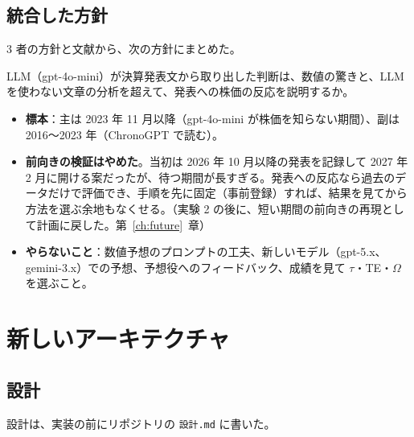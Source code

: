 \documentclass[xelatex,ja=standard,jafont=haranoaji,a4paper,10pt]{bxjsreport}
\newcommand{\code}[1]{\texttt{#1}}
\newcommand{\chapref}[1]{第~\ref{#1}~章}
\begin{document}
\chapter{統合した方針}\label{ch:plan}

3 者の方針と文献から、次の方針にまとめた。

\begin{verdict}[研究の主な問い]
LLM（gpt-4o-mini）が決算発表文から取り出した判断は、数値の驚きと、LLM を使わない文章の分析を超えて、発表への株価の反応を説明するか。
\end{verdict}

\begin{itemize}
\item \textbf{標本}：主は 2023 年 11 月以降（gpt-4o-mini が株価を知らない期間）、副は 2016〜2023 年（ChronoGPT で読む）。
\item \textbf{前向きの検証はやめた}。当初は 2026 年 10 月以降の発表を記録して 2027 年 2 月に開ける案だったが、待つ期間が長すぎる。発表への反応なら過去のデータだけで評価でき、手順を先に固定（事前登録）すれば、結果を見てから方法を選ぶ余地もなくせる。（実験 2 の後に、短い期間の前向きの再現として計画に戻した。\chapref{ch:future}）
\item \textbf{やらないこと}：数値予想のプロンプトの工夫、新しいモデル（gpt-5.x、gemini-3.x）での予想、予想役へのフィードバック、成績を見て $\tau$・TE・$\Omega$ を選ぶこと。
\end{itemize}

\part{新しいアーキテクチャ}

\chapter{設計}\label{ch:design}

設計は、実装の前にリポジトリの \code{設計.md} に書いた。
\end{document}

